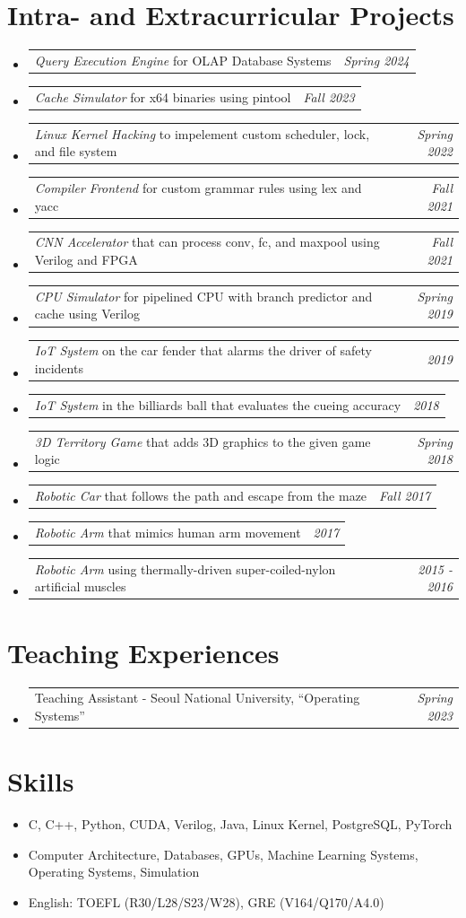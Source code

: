 \documentclass[a4paper]{article}
\makeatletter
\newcommand{\resumeSubheadingSimple}[2]{
  \vspace{-1pt}\item
	\begin{tabular*}{0.97\textwidth}{l@{\extracolsep{\fill}}r}
	  #1 & \textit{#2} \\
	\end{tabular*}
  \vspace{-1pt}
}
\newcommand{\resumeSubheadingVerySimple}[1]{
	\vspace{-1pt}\item #1
	\vspace{-1pt}
}
\newcommand{\resumeSubHeadingListStart}{\begin{itemize}[leftmargin=*]}
\newcommand{\resumeSubHeadingListEnd}{\end{itemize}}
\makeatother
\begin{document}
\section{Intra- and Extracurricular Projects}
\resumeSubHeadingListStart
	\resumeSubheadingSimple{
		\textit{Query Execution Engine} for OLAP Database Systems
	}{Spring 2024}
	\resumeSubheadingSimple{
		\textit{Cache Simulator} for x64 binaries using pintool
	}{Fall 2023}
	\resumeSubheadingSimple{
		\textit{Linux Kernel Hacking} to impelement custom scheduler, lock, and file system
	}{Spring 2022}
	\resumeSubheadingSimple{
		\textit{Compiler Frontend} for custom grammar rules using lex and yacc
	}{Fall 2021}
	\resumeSubheadingSimple{
		\textit{CNN Accelerator} that can process conv, fc, and maxpool using Verilog and FPGA
	}{Fall 2021}
	\resumeSubheadingSimple{
		\textit{CPU Simulator} for pipelined CPU with branch predictor and cache using Verilog
	}{Spring 2019}
	\resumeSubheadingSimple{
		\textit{IoT System} on the car fender that alarms the driver of safety incidents
	}{2019}
	\resumeSubheadingSimple{
		\textit{IoT System} in the billiards ball that evaluates the cueing accuracy
	}{2018}
	\resumeSubheadingSimple{
		\textit{3D Territory Game} that adds 3D graphics to the given game logic
	}{Spring 2018}
	\resumeSubheadingSimple{
		\textit{Robotic Car} that follows the path and escape from the maze
	}{Fall 2017}
	\resumeSubheadingSimple{
		\textit{Robotic Arm} that mimics human arm movement
	}{2017}
	\resumeSubheadingSimple{
		\textit{Robotic Arm} using thermally-driven super-coiled-nylon artificial muscles
	}{2015 - 2016}
\resumeSubHeadingListEnd

\section{Teaching Experiences}
\resumeSubHeadingListStart
	\resumeSubheadingSimple{
		Teaching Assistant - Seoul National University, ``Operating Systems''
	}{Spring 2023}
\resumeSubHeadingListEnd

\section{Skills}
\resumeSubHeadingListStart
	\resumeSubheadingVerySimple{
		C, C++, Python, CUDA, Verilog, Java, Linux Kernel, PostgreSQL, PyTorch
	}
	\resumeSubheadingVerySimple{
		Computer Architecture, Databases, GPUs, Machine Learning Systems, Operating Systems, Simulation
	}
	\resumeSubheadingVerySimple{
		English: TOEFL (R30/L28/S23/W28), GRE (V164/Q170/A4.0)
	}
\resumeSubHeadingListEnd
\end{document}
